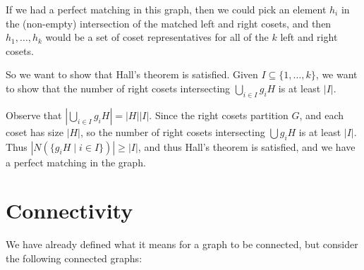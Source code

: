 \begin{example}
\begin{center}

\end{center}

If we had a perfect matching in this graph, then we could pick an element $h_i$ in the (non-empty) intersection of the matched left and right cosets, and then $h_1, \dots, h_k$ would be a set of coset representatives for all of the $k$ left and right cosets.

So we want to show that Hall's theorem is satisfied.
Given $I \subseteq \{1, \dots, k\}$, we want to show that the number of right cosets intersecting $\bigcup_{i \in I} g_i H$ is at least $|I|$.

Observe that $\left|\bigcup_{i \in I} g_i H\right| = |H| |I|$. Since the right cosets partition $G$, and each coset has size $|H|$, so the number of right cosets intersecting $\bigcup g_i H$ is at least $|I|$. Thus $|N(\{g_iH \mid i \in I\})| \geq |I|$, and thus Hall's theorem is satisfied, and we have a perfect matching in the graph.

\end{example}

\section{Connectivity}

We have already defined what it means for a graph to be connected, but consider the following connected graphs:

